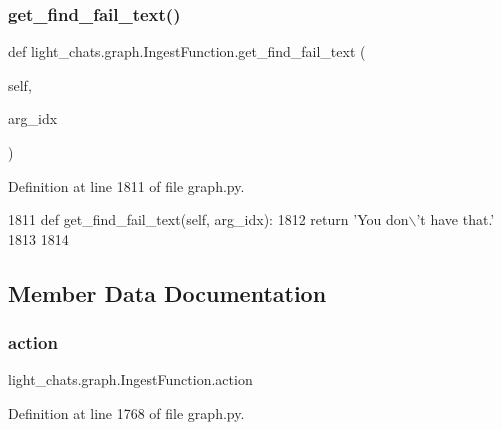 \subsubsection{\texorpdfstring{get\+\_\+find\+\_\+fail\+\_\+text()}{get\_find\_fail\_text()}}
{\footnotesize\ttfamily def light\+\_\+chats.\+graph.\+Ingest\+Function.\+get\+\_\+find\+\_\+fail\+\_\+text (\begin{DoxyParamCaption}\item[{}]{self,  }\item[{}]{arg\+\_\+idx }\end{DoxyParamCaption})}



Definition at line 1811 of file graph.\+py.


\begin{DoxyCode}
1811     \textcolor{keyword}{def }get\_find\_fail\_text(self, arg\_idx):
1812         \textcolor{keywordflow}{return} \textcolor{stringliteral}{'You don\(\backslash\)'t have that.'}
1813 
1814 
\end{DoxyCode}


\subsection{Member Data Documentation}
\mbox{\label{classlight__chats_1_1graph_1_1IngestFunction_a622f30ce7ef9f3c210c1881eab7c2744}} 
\subsubsection{\texorpdfstring{action}{action}}
{\footnotesize\ttfamily light\+\_\+chats.\+graph.\+Ingest\+Function.\+action}



Definition at line 1768 of file graph.\+py.

\mbox{\label{classlight__chats_1_1graph_1_1IngestFunction_af639522820335d377bf31825afe21584}} 
